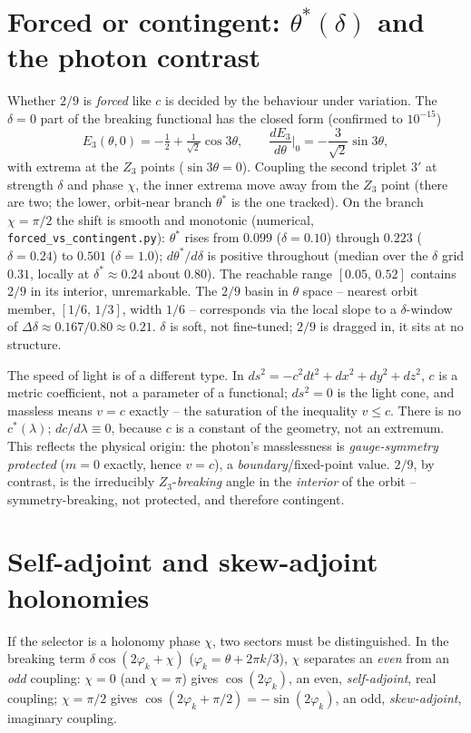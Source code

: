 \section{Forced or contingent: $\theta^*(\delta)$ and the photon contrast}
Whether $2/9$ is \emph{forced} like $c$ is decided by the behaviour under variation. The
$\delta=0$ part of the breaking functional has the closed form (confirmed to $10^{-15}$)
\[
E_3(\theta,0)=-\tfrac12+\tfrac{1}{\sqrt2}\cos 3\theta,\qquad
\frac{dE_3}{d\theta}\Big|_{0}=-\frac{3}{\sqrt2}\sin 3\theta,
\]
with extrema at the $Z_3$ points ($\sin3\theta=0$). Coupling the second triplet $3'$ at
strength $\delta$ and phase $\chi$, the inner extrema move away from the $Z_3$ point (there are
two; the lower, orbit-near branch $\theta^*$ is the one tracked). On the branch $\chi=\pi/2$ the
shift is smooth and monotonic (numerical,
\texttt{forced\_vs\_contingent.py}): $\theta^*$ rises from $0.099$ ($\delta=0.10$) through
$0.223$ ($\delta=0.24$) to $0.501$ ($\delta=1.0$); $d\theta^*/d\delta$ is positive throughout
(median over the $\delta$ grid $0.31$, locally at $\delta^*\approx0.24$ about $0.80$). The
reachable range $[0.05,\,0.52]$ contains $2/9$ in its interior, unremarkable. The $2/9$ basin in
$\theta$ space -- nearest orbit member, $[1/6,\,1/3]$, width $1/6$ -- corresponds via the local
slope to a $\delta$-window of $\Delta\delta\approx0.167/0.80\approx0.21$.
$\delta$ is soft, not fine-tuned; $2/9$ is dragged in, it sits at no structure.

The speed of light is of a different type. In $ds^2=-c^2dt^2+dx^2+dy^2+dz^2$, $c$ is a metric
coefficient, not a parameter of a functional; $ds^2=0$ is the light cone, and massless means
$v=c$ exactly -- the saturation of the inequality $v\le c$. There is no $c^*(\lambda)$;
$dc/d\lambda\equiv0$, because $c$ is a constant of the geometry, not an extremum. This reflects
the physical origin: the photon's masslessness is \emph{gauge-symmetry protected} ($m=0$
exactly, hence $v=c$), a \emph{boundary}/fixed-point value. $2/9$, by contrast, is the
irreducibly $Z_3$-\emph{breaking} angle in the \emph{interior} of the orbit -- symmetry-breaking,
not protected, and therefore contingent.

\section{Self-adjoint and skew-adjoint holonomies}
If the selector is a holonomy phase $\chi$, two sectors must be distinguished. In the breaking
term $\delta\cos(2\varphi_k+\chi)$ ($\varphi_k=\theta+2\pi k/3$), $\chi$ separates an
\emph{even} from an \emph{odd} coupling: $\chi=0$ (and $\chi=\pi$) gives $\cos(2\varphi_k)$, an
even, \emph{self-adjoint}, real coupling; $\chi=\pi/2$ gives
$\cos(2\varphi_k+\pi/2)=-\sin(2\varphi_k)$, an odd, \emph{skew-adjoint}, imaginary coupling.


